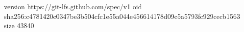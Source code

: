 version https://git-lfs.github.com/spec/v1
oid sha256:c4781420c0347be3b504cfc1e55a044e456614178d09c5a5793fc929cecb1563
size 43840
